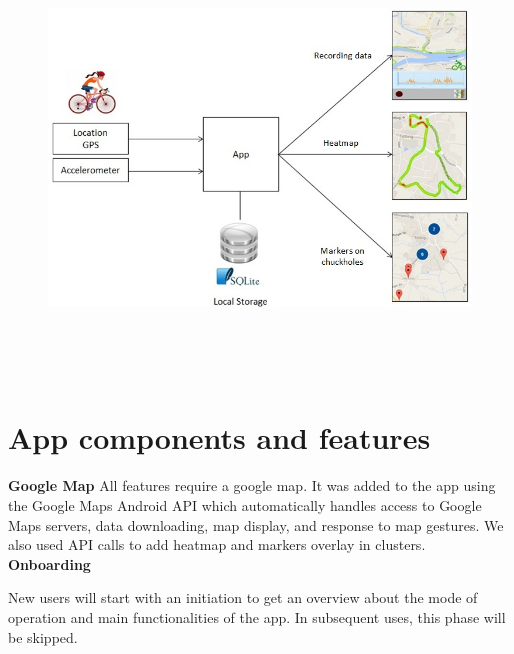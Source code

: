 \documentclass[10pt,a4paper]{article} %
\begin{document}
	\begin{figure}[H]
	\centering
    \includegraphics[width=15cm, height=11.5cm]{pic1}
    \end{figure}
    
    
    
    
    \section{App components and features}
    
    \textbf{Google Map}
    All features require a google map. It was added to the app using the Google Maps Android API which automatically handles access to Google Maps servers, data downloading, map display, and response to map gestures. 
    We also used API calls to add heatmap and markers overlay in clusters. 
    \textbf{Onboarding}
    
    New users will start with an initiation to get an overview about the mode of operation and main functionalities of the app. In subsequent uses, this phase will be skipped.
    
    
    
\end{document}
